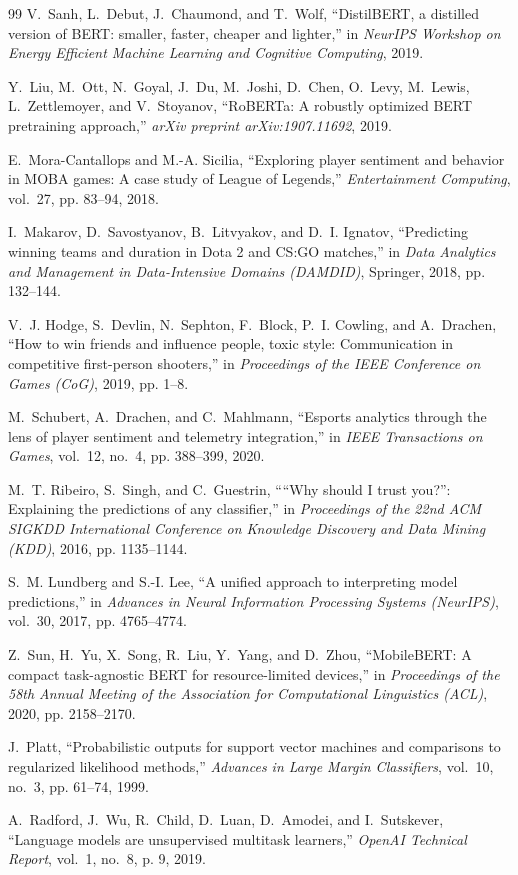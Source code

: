 \begin{thebibliography}{99}
V.~Sanh, L.~Debut, J.~Chaumond, and T.~Wolf, ``DistilBERT, a distilled version of BERT: smaller, faster, cheaper and lighter,'' in \emph{NeurIPS Workshop on Energy Efficient Machine Learning and Cognitive Computing}, 2019.

Y.~Liu, M.~Ott, N.~Goyal, J.~Du, M.~Joshi, D.~Chen, O.~Levy, M.~Lewis, L.~Zettlemoyer, and V.~Stoyanov, ``RoBERTa: A robustly optimized BERT pretraining approach,'' \emph{arXiv preprint arXiv:1907.11692}, 2019.

E.~Mora-Cantallops and M.-A. Sicilia, ``Exploring player sentiment and behavior in MOBA games: A case study of League of Legends,'' \emph{Entertainment Computing}, vol.~27, pp. 83--94, 2018.

I.~Makarov, D.~Savostyanov, B.~Litvyakov, and D.~I. Ignatov, ``Predicting winning teams and duration in Dota 2 and CS:GO matches,'' in \emph{Data Analytics and Management in Data-Intensive Domains (DAMDID)}, Springer, 2018, pp. 132--144.

V.~J. Hodge, S.~Devlin, N.~Sephton, F.~Block, P.~I. Cowling, and A.~Drachen, ``How to win friends and influence people, toxic style: Communication in competitive first-person shooters,'' in \emph{Proceedings of the IEEE Conference on Games (CoG)}, 2019, pp. 1--8.

M.~Schubert, A.~Drachen, and C.~Mahlmann, ``Esports analytics through the lens of player sentiment and telemetry integration,'' in \emph{IEEE Transactions on Games}, vol.~12, no.~4, pp. 388--399, 2020.

M.~T. Ribeiro, S.~Singh, and C.~Guestrin, ````Why should I trust you?'': Explaining the predictions of any classifier,'' in \emph{Proceedings of the 22nd ACM SIGKDD International Conference on Knowledge Discovery and Data Mining (KDD)}, 2016, pp. 1135--1144.

S.~M. Lundberg and S.-I. Lee, ``A unified approach to interpreting model predictions,'' in \emph{Advances in Neural Information Processing Systems (NeurIPS)}, vol.~30, 2017, pp. 4765--4774.

Z.~Sun, H.~Yu, X.~Song, R.~Liu, Y.~Yang, and D.~Zhou, ``MobileBERT: A compact task-agnostic BERT for resource-limited devices,'' in \emph{Proceedings of the 58th Annual Meeting of the Association for Computational Linguistics (ACL)}, 2020, pp. 2158--2170.

J.~Platt, ``Probabilistic outputs for support vector machines and comparisons to regularized likelihood methods,'' \emph{Advances in Large Margin Classifiers}, vol.~10, no.~3, pp. 61--74, 1999.

A.~Radford, J.~Wu, R.~Child, D.~Luan, D.~Amodei, and I.~Sutskever, ``Language models are unsupervised multitask learners,'' \emph{OpenAI Technical Report}, vol.~1, no.~8, p. 9, 2019.

\end{thebibliography}
